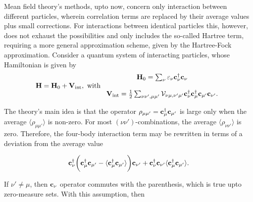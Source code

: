 Mean field theory's methods, upto now, concern only interaction between different particles, wherein correlation terms are replaced by their average values plus small corrections. For interactions between identical particles this, however, does not exhaust the possibilities and only includes the so-called Hartree term, requiring a more general approximation scheme, given by the Hartree-Fock approximation. Consider a quantum system of interacting particles, whose Hamiltonian is given by 
\begin{equation}
    {\bf H} = {\bf H}_0 + {\bf V}_{\textnormal{int}}, \textnormal{ with } \begin{array}{c}
         {\bf H}_0 = \sum_{\nu} \varepsilon_{\nu} {\bf c}_{\nu}^\dagger {\bf c}_{\nu}\\
         \\
         {\bf V}_{\textnormal{int}}  = \frac{1}{2} \sum_{\nu\nu', \mu\mu'} {\mathcal V}_{\nu\mu, \nu'\mu'} {\bf c}_{\nu}^\dagger {\bf c}_{\mu}^\dagger {\bf c}_{\mu'} {\bf c}_{\nu'}.\\
    \end{array}
\end{equation}

The theory's main idea is that the operator $\rho_{\mu \mu'} = {\bf c}_{\mu}^\dagger {\bf c}_{\mu'}$ is large only when the average $\langle \rho_{\mu \mu'} \rangle$ is non-zero. For most $(\nu \nu')$-combinations, the average $\langle \rho_{\nu \nu'} \rangle$ is zero. Therefore, the four-body interaction term may be rewritten in terms of a deviation from the average value

$$
    {\bf c}_{\nu}^\dagger \bigg({\bf c}_{\mu}^\dagger {\bf c}_{\mu'} - \langle {\bf c}_{\mu}^\dagger {\bf c}_{\mu'} \rangle \bigg) {\bf c}_{\nu'} + {\bf c}_{\nu}^\dagger {\bf c}_{\nu'} \langle {\bf c}_{\mu}^\dagger {\bf c}_{\mu'}\rangle.
$$

If $\nu' \neq \mu$, then ${\bf c}_{\nu}$ operator commutes with the parenthesis, which is true upto zero-measure sets. With this assumption, then

